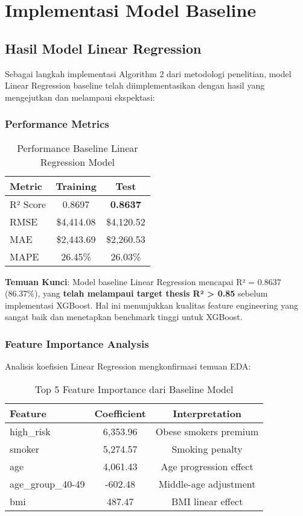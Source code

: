 \section{Implementasi Model Baseline}
\label{sec:baseline-model}

\subsection{Hasil Model Linear Regression}
\label{subsec:baseline-results}

Sebagai langkah implementasi Algorithm 2 dari metodologi penelitian, model Linear Regression baseline telah diimplementasikan dengan hasil yang mengejutkan dan melampaui ekspektasi:

\subsubsection{Performance Metrics}
\begin{table}[H]
\centering
\caption{Performance Baseline Linear Regression Model}
\label{tab:baseline-performance}
\begin{tabular}{|l|c|c|}
\hline
\textbf{Metric} & \textbf{Training} & \textbf{Test} \\
\hline
R² Score & 0.8697 & \textbf{0.8637} \\
RMSE & \$4,414.08 & \$4,120.52 \\
MAE & \$2,443.69 & \$2,260.53 \\
MAPE & 26.45\% & 26.03\% \\
\hline
\end{tabular}
\end{table}

\textbf{Temuan Kunci}: Model baseline Linear Regression mencapai R² = 0.8637 (86.37\%), yang \textbf{telah melampaui target thesis R² > 0.85} sebelum implementasi XGBoost. Hal ini menunjukkan kualitas feature engineering yang sangat baik dan menetapkan benchmark tinggi untuk XGBoost.

\subsubsection{Feature Importance Analysis}
Analisis koefisien Linear Regression mengkonfirmasi temuan EDA:

\begin{table}[H]
\centering
\caption{Top 5 Feature Importance dari Baseline Model}
\label{tab:baseline-features}
\begin{tabular}{|l|c|c|}
\hline
\textbf{Feature} & \textbf{Coefficient} & \textbf{Interpretation} \\
\hline
high\_risk & 6,353.96 & Obese smokers premium \\
smoker & 5,274.57 & Smoking penalty \\
age & 4,061.43 & Age progression effect \\
age\_group\_40-49 & -602.48 & Middle-age adjustment \\
bmi & 487.47 & BMI linear effect \\
\hline
\end{tabular}
\end{table}

